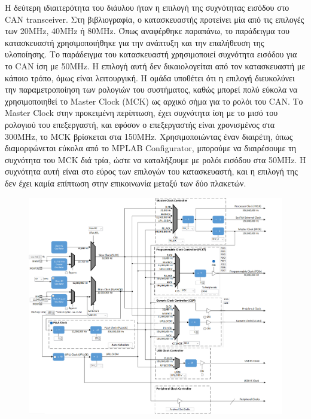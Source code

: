 \documentclass[a4paper,nobib,justified]{tufte-book}
\begin{document}
Η δεύτερη ιδιαιτερότητα του διάυλου ήταν η επιλογή της συχνότητας εισόδου στο CAN transceiver. Στη βιβλιογραφία, ο κατασκευαστής προτείνει μία από τις επιλογές των 20MHz, 40MHz ή 80MHz. Όπως αναφέρθηκε παραπάνω, το παράδειγμα του κατασκευαστή χρησιμοποιήθηκε για την ανάπτυξη και την επαλήθευση της υλοποίησης. Το παράδειγμα του κατασκευαστή χρησιμοποιεί συχνότητα εισόδου για το CAN ίση με 50MHz. Η επιλογή αυτή δεν δικαιολογείται από τον κατασκευαστή με κάποιο τρόπο, όμως είναι λειτουργική. Η ομάδα υποθέτει ότι η επιλογή διευκολύνει την παραμετροποίηση των ρολογιών του συστήματος, καθώς μπορεί πολύ εύκολα να χρησιμοποιηθεί το Master Clock (MCK) ως αρχικό σήμα για το ρολόι του CAN. Το Master Clock στην προκειμένη περίπτωση, έχει συχνότητα ίση με το μισό του ρολογιού του επεξεργαστή, και εφόσον ο επεξεργαστής είναι χρονισμένος στα 300MHz, το MCK βρίσκεται στα 150MHz. Χρησιμοποιώντας έναν διαιρέτη, όπως διαμορφώνεται εύκολα από το MPLAB Configurator, μπορούμε να διαιρέσουμε τη συχνότητα του MCK διά τρία, ώστε να καταλήξουμε με ρολόι εισόδου στα 50MHz. Η συχνότητα αυτή είναι στο εύρος των επιλογών του κατασκευαστή, και η επιλογή της δεν έχει καμία επίπτωση στην επικοινωνία μεταξύ των δύο πλακετών.

\begin{figure}[h]
	\label{fig:mplab-clock}
	\includegraphics{media/images/mplab-clock-diagram.png}
\end{figure}

\end{document}
